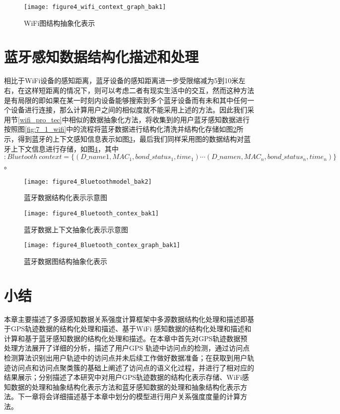 \begin{figure}[htp]
\centering
\texttt{[image: figure4\_wifi\_context\_graph\_bak1]}
\caption{WiFi图结构抽象化表示}
\label{fig:wifi_context_graph}
\end{figure}
\section{蓝牙感知数据结构化描述和处理}
相比于WiFi设备的感知距离，蓝牙设备的感知距离进一步受限缩减为5到10米左右，在这样短距离的情况下，则可以考虑二者有现实生活中的交互，然而这种方法是有局限的即如果在某一时刻内设备能够搜索到多个蓝牙设备而有未和其中任何一个设备进行连接，那么计算用户之间的相似度就不能采用上述的方法。因此我们采用节\ref{wifi_pro_tec}中相似的数据抽象化方法，将收集到的用户蓝牙感知数据进行按照图\ref{fig:7_1_wifi}中的流程将蓝牙数据进行结构化清洗并结构化存储如图\ref{fig:Bluetoothmodel}所示，得到蓝牙的上下文感知信息表示如图\ref{fig:bluetooth_context}，最后我们同样采用图的数据结构对蓝牙上下文信息进行存储，如图\ref{fig:bluetooth_context_graph}，其中$:Bluetooth \ context= \{ (D\_name{1},MAC_{1},bond\_status_{1},time_{1}) \cdots  (D\_name{n},MAC_{n},bond\_status_{n},time_{n}) \}$。
\begin{figure}[htp]
\centering
\texttt{[image: figure4\_Bluetoothmodel\_bak2]}
\caption{蓝牙数据结构化表示示意图}
\label{fig:Bluetoothmodel}
\end{figure}

\begin{figure}[htp]
\centering
\texttt{[image: figure4\_Bluetooth\_contex\_bak1]}
\caption{蓝牙数据上下文抽象化表示示意图}
\label{fig:bluetooth_context}
\end{figure}

\begin{figure}[htb]
\centering
\texttt{[image: figure4\_Bluetooth\_contex\_graph\_bak1]}
\caption{蓝牙数据图结构抽象化表示}
\label{fig:bluetooth_context_graph}
\end{figure}
\newpage
\section{小结}
\label{sec:section3-5}
本章主要描述了多源感知数据关系强度计算框架中多源数据结构化处理和描述即基于GPS轨迹数据的结构化处理和描述、基于WiFi 感知数据的结构化处理和描述和计算和基于蓝牙感知数据的结构化处理和描述。在本章中首先对GPS轨迹数据预处理方法展开了详细的分析，描述了用户GPS 轨迹中访问点的检测，通过访问点检测算法识别出用户轨迹中的访问点并未后续工作做好数据准备；在获取到用户轨迹访问点和访问点聚类簇的基础上阐述了访问点的语义化过程，并进行了相对应的结果展示；分别描述了本研究中对用户GPS轨迹数据的结构化表示存储、WiFi感知数据的处理和抽象结构化表示方法和蓝牙感知数据的处理和抽象结构化表示方法。下一章将会详细描述基于本章中划分的模型进行用户关系强度度量的计算方法。
